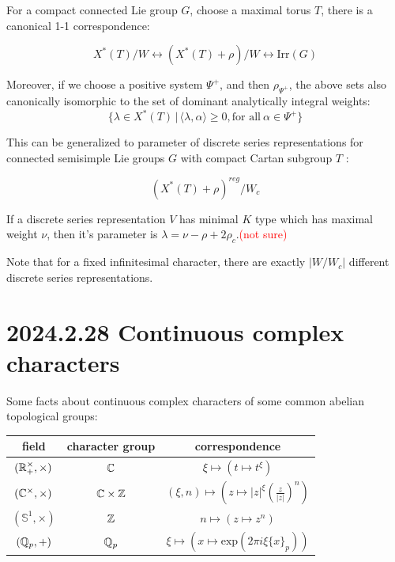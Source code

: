 \documentclass[12pt]{amsart}
\numberwithin{equation}{section}
\newcommand{\BS}{{\mathbb {S}}} \newcommand{\BT}{{\mathbb {T}}} \newcommand{\BU}{{\mathbb {U}}}
\newcommand{\set}[2]{\{#1\,|\,#2\}}
\begin{document}
For a compact connected Lie group $G$, choose a maximal torus $T$, there is a canonical 1-1 correspondence:

$$X^*(T)/W \longleftrightarrow (X^*(T)+\rho)/W \longleftrightarrow \mathrm{Irr}(G)$$

Moreover, if we choose a positive system $\Psi^+$, and then $\rho_{\Psi^+}$, the above sets also canonically isomorphic to the set of dominant analytically integral weights:
$$\set{\lambda \in X^*(T)}{ \langle\lambda, \alpha \rangle \geq 0, \text{for all} \ \alpha \in \Psi^+ }$$

This can be generalized to parameter of discrete series representations for connected semisimple Lie groups $G$ with compact Cartan subgroup $T$ :

$$ (X^*(T) + \rho)^{reg}/W_c$$

If a discrete series representation $V$ has minimal $K$ type which has maximal weight $\nu$, then it's parameter is $\lambda = \nu -\rho + 2\rho_c $.\textcolor{red}{(not sure)}

Note that for a fixed infinitesimal character, there are exactly $|W/W_c|$ different discrete series representations.



\section{2024.2.28 Continuous complex characters}\label{5}
Some facts about continuous complex characters of some common abelian topological groups:

\begin{tabular}{|c|c|c|}
  \hline
  field            & character group & correspondence                                \\
  \hline
  $({\mathbb {R}}^\times_+,\times)$        & ${\mathbb {C}}$           & $\xi \mapsto (t \mapsto t^\xi)$ \\
  \hline
  $({\mathbb {C}}^\times,\times) $ &    ${\mathbb {C}} \times {\mathbb {Z}}$             & $(\xi,n) \mapsto (z \mapsto |z|^\xi (\frac{z}{|z|})^n)$                                              \\
  \hline
  $(\BS^1,\times)$          &  ${\mathbb {Z}}$               & $n \mapsto (z \mapsto z^n)$                                              \\
  \hline
  $({\mathbb {Q}}_p,+)$          & ${\mathbb {Q}}_p$                 &  $\xi \mapsto (x \mapsto \mathrm{exp}(2\pi i \xi \{ x \}_p))$                                             \\
  \hline
\end{tabular}
\end{document}
